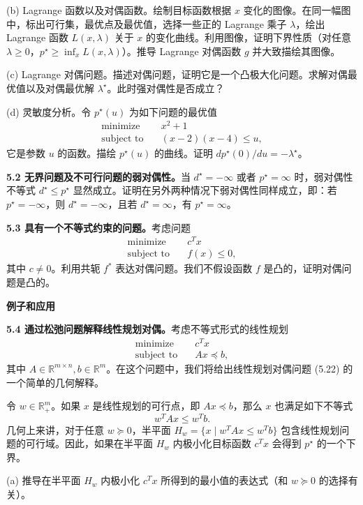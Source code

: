 \documentclass[UTF8,12pt,a4paper,fontset=fandol]{ctexart}
\begin{document}
(b) Lagrange 函数以及对偶函数。绘制目标函数根据 $x$ 变化的图像。在同一幅图中，标出可行集，最优点及最优值，选择一些正的 Lagrange 乘子 $\lambda$，绘出 Lagrange 函数 $L(x,\lambda)$ 关于 $x$ 的变化曲线。利用图像，证明下界性质（对任意 $\lambda\geq 0$，$p^\star\geq\inf_x L(x,\lambda)$）。推导 Lagrange 对偶函数 $g$ 并大致描绘其图像。

(c) Lagrange 对偶问题。描述对偶问题，证明它是一个凸极大化问题。求解对偶最优值以及对偶最优解 $\lambda^\star$。此时强对偶性是否成立？

(d) 灵敏度分析。令 $p^\star(u)$ 为如下问题的最优值
\[
\begin{aligned}
\text{minimize}\quad & x^2+1\\
\text{subject to}\quad & (x-2)(x-4)\leq u,
\end{aligned}
\]
它是参数 $u$ 的函数。描绘 $p^\star(u)$ 的曲线。证明 $dp^\star(0)/du=-\lambda^\star$。

\noindent\textbf{5.2 无界问题及不可行问题的弱对偶性。}\quad 当 $d^\star=-\infty$ 或者 $p^\star=\infty$ 时，弱对偶性不等式 $d^\star\leq p^\star$ 显然成立。证明在另外两种情况下弱对偶性同样成立，即：若 $p^\star=-\infty$，则 $d^\star=-\infty$，且若 $d^\star=\infty$，有 $p^\star=\infty$。

\noindent\textbf{5.3 具有一个不等式约束的问题。}\quad 考虑问题
\[
\begin{aligned}
\text{minimize}\quad & c^Tx\\
\text{subject to}\quad & f(x)\leq 0,
\end{aligned}
\]
其中 $c\neq 0$。利用共轭 $f^\ast$ 表达对偶问题。我们不假设函数 $f$ 是凸的，证明对偶问题是凸的。

\noindent\textbf{例子和应用}

\noindent\textbf{5.4 通过松弛问题解释线性规划对偶。}\quad 考虑不等式形式的线性规划
\[
\begin{aligned}
\text{minimize}\quad & c^Tx\\
\text{subject to}\quad & Ax\preceq b,
\end{aligned}
\]
其中 $A\in\mathbb{R}^{m\times n}, b\in\mathbb{R}^m$。在这个问题中，我们将给出线性规划对偶问题 (5.22) 的一个简单的几何解释。

令 $w\in\mathbb{R}_+^m$。如果 $x$ 是线性规划的可行点，即 $Ax\preceq b$，那么 $x$ 也满足如下不等式
\[
w^TAx\leq w^Tb.
\]
几何上来讲，对于任意 $w\succeq 0$，半平面 $H_w=\{x\mid w^TAx\leq w^Tb\}$ 包含线性规划问题的可行域。因此，如果在半平面 $H_w$ 内极小化目标函数 $c^Tx$ 会得到 $p^\star$ 的一个下界。

(a) 推导在半平面 $H_w$ 内极小化 $c^Tx$ 所得到的最小值的表达式（和 $w\succeq 0$ 的选择有关）。
\end{document}

